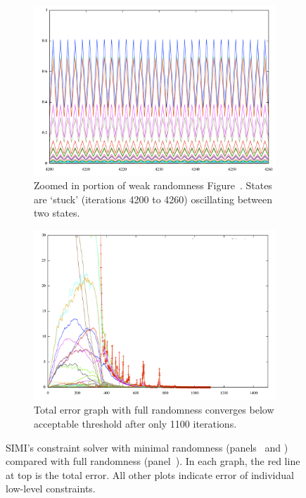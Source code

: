 \begin{landscape}
\begin{figure}
  \begin{subfigure}[t]{0.6\textwidth}
    \centering
    \includegraphics[width=0.8\linewidth]{img/jessica-norandom-closeup.pdf}
    \caption{Zoomed in portion of weak randomness
      Figure~. States are `stuck'
      (iterations 4200 to 4260) oscillating between two states.}
    \label{fig:jessica-closeup}
  \end{subfigure}
  \hspace{0.03\textwidth}
  \begin{subfigure}[t]{0.6\textwidth}
    \centering
    \includegraphics[width=0.8\linewidth]{img/jessica-with-fullrandom.png}
    \caption{Total error graph with full randomness converges below
      acceptable threshold after only 1100 iterations.}
    \label{fig:jessica-fullrandom}
  \end{subfigure}
  \caption[Constraint Solver Minimal vs. Full Randomness]{SIMI's
    constraint solver with minimal randomness
    (panels~\textit{} and
    \textit{}) compared with full
    randomness (panel~\textit{}). In
    each graph, the red line at top is the total error. All other
    plots indicate error of individual low-level constraints.}
  \label{fig:jessica}
\end{figure}
\end{landscape}
